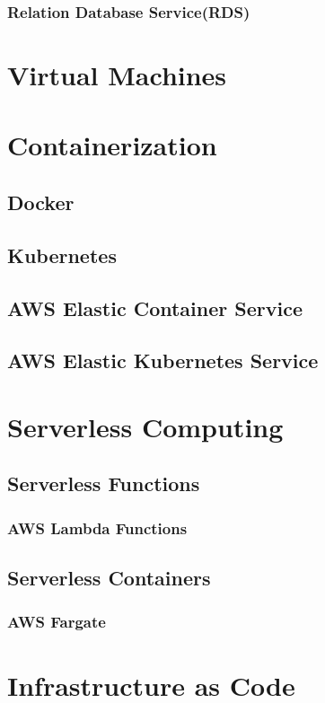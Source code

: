 \subsection{Relation Database Service(RDS)}

\chapter{Virtual Machines}

\chapter{Containerization}
\section{Docker}
\section{Kubernetes}
\section{AWS Elastic Container Service}
\section{AWS Elastic Kubernetes Service}

\chapter{Serverless Computing}
\section{Serverless Functions}
\subsection{AWS Lambda Functions}
\section{Serverless Containers}
\subsection{AWS Fargate}

\chapter{Infrastructure as Code}
